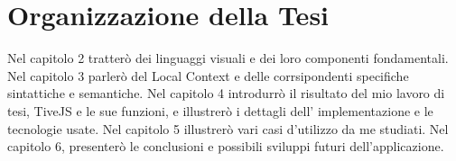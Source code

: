     \section{Organizzazione della Tesi}
        Nel capitolo 2 tratterò dei linguaggi visuali e dei loro componenti fondamentali. Nel capitolo 3 parlerò del Local Context e delle corrsipondenti specifiche sintattiche e semantiche. Nel capitolo 4 introdurrò il risultato del mio lavoro di tesi, TiveJS e le sue funzioni, e illustrerò  i dettagli dell' implementazione e le tecnologie usate. Nel capitolo 5 illustrerò vari casi d'utilizzo da me studiati. Nel capitolo 6, presenterò le conclusioni e possibili sviluppi futuri dell'applicazione.